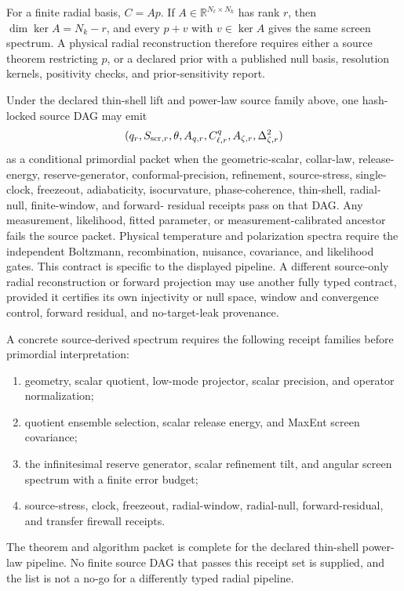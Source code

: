 \begin{proposition}\label{prop:oph-radial-null}
For a finite radial basis, \(C=Ap\).  If \(A\in\mathbb R^{N_\ell\times N_k}\) has rank \(r\),
then \(\dim\ker A=N_k-r\), and every \(p+v\) with \(v\in\ker A\) gives the same screen spectrum.
A physical radial reconstruction therefore requires either a source theorem restricting \(p\), or a declared prior
with a published null basis, resolution kernels, positivity checks, and prior-sensitivity report.
\end{proposition}

\begin{theorem}\label{thm:oph-screen-spectrum-promotion}
Under the declared thin-shell lift and power-law source family above, one
hash-locked source DAG may emit
\[
(q_r,S_{{\rm scr},r},\theta,A_{q,r},C_{\ell,r}^q,A_{\zeta,r},
\Delta_{\zeta,r}^2)
\]
as a conditional primordial packet when the geometric-scalar, collar-law, release-energy,
reserve-generator, conformal-precision, refinement, source-stress, single-clock, freezeout,
adiabaticity, isocurvature, phase-coherence, thin-shell, radial-null, finite-window, and forward-
residual receipts pass on that DAG.  Any measurement, likelihood, fitted parameter, or
measurement-calibrated ancestor fails the source packet.  Physical temperature and polarization
spectra require the independent Boltzmann, recombination, nuisance, covariance, and likelihood
gates. This contract is specific to the displayed pipeline. A different
source-only radial reconstruction or forward projection may use another
fully typed contract, provided it certifies its own injectivity or null space,
window and convergence control, forward residual, and no-target-leak
provenance.
\end{theorem}

\begin{target}\label{target:oph-screen-spectrum-receipts}
A concrete source-derived spectrum requires the following receipt families before primordial
interpretation:
\begin{enumerate}[leftmargin=2em]
\item geometry, scalar quotient, low-mode projector, scalar precision, and operator normalization;
\item quotient ensemble selection, scalar release energy, and MaxEnt screen covariance;
\item the infinitesimal reserve generator, scalar refinement tilt, and angular screen spectrum
with a finite error budget;
\item source-stress, clock, freezeout, radial-window, radial-null, forward-residual, and transfer
firewall receipts.
\end{enumerate}
The theorem and algorithm packet is complete for the declared thin-shell
power-law pipeline. No finite source DAG that passes this receipt set is
supplied, and the list is not a no-go for a differently typed radial pipeline.
\end{target}
